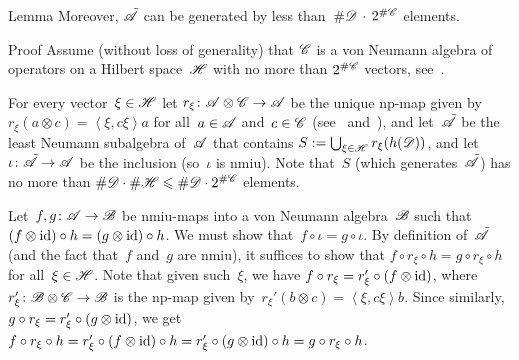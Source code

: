 \documentclass[a]{subfiles}
\begin{document}
\begin{parsec}
\begin{point}{Lemma}
Moreover,
$\tilde{\mathscr{A}}$
can be generated by
less than~$\#\mathscr{D}\,\cdot\,2^{\#\mathscr{C}}$ elements.
\begin{point}{Proof}%
Assume (without loss of generality)
that
$\mathscr{C}$
is a von Neumann algebra of operators on
a Hilbert space~$\mathscr{H}$
with no more than $2^{\#\mathscr{C}}$ vectors, see~.

For every vector~$\xi\in \mathscr{H}$
let
$r_\xi\colon \mathscr{A}\otimes \mathscr{C}\to\mathscr{A}$
be the unique np-map
given by~$r_\xi(a\otimes c) = \left<\xi,c\xi\right> a$
for all~$a\in\mathscr{A}$ and~$c\in \mathscr{C}$
(see~
and~),
and
let~$\tilde{\mathscr{A}}$
be the least Neumann subalgebra
of~$\mathscr{A}$
that contains $S:=\smash{ \bigcup_{\xi \in\mathscr{H}} r_\xi(h(\mathscr{D}))}$,
and let~$\iota\colon \tilde{\mathscr{A}}\to\mathscr{A}$
be the inclusion
(so~$\iota$ is nmiu).
Note that~$S$ (which generates~$\tilde{\mathscr{A}}$)
has no more than $\#\mathscr{D}\cdot\#\mathscr{H}\leqslant \#\mathscr{D} \cdot 2^{\#\mathscr{C}}$
elements.

Let~$f,g\colon \mathscr{A}\to\mathscr{B}$
be nmiu-maps
into a von Neumann algebra~$\mathscr{B}$
such that $(f\otimes\operatorname{id})\circ h = (g\otimes \operatorname{id})\circ h$.
We must show that~$f\circ \iota = g\circ \iota$.
By definition of~$\tilde{\mathscr{A}}$
(and the fact that~$f$ and~$g$ are nmiu),
it suffices to show that $f\circ r_\xi\circ h=g\circ r_\xi\circ h$
for all~$\xi\in\mathscr{H}$.
Note that given such~$\xi$,
we have $f\circ r_\xi = r_\xi' \circ (f\otimes\operatorname{id})$,
where~$r_\xi'\colon \mathscr{B}\otimes\mathscr{C}\to\mathscr{B}$
is the np-map
given by~$r_\xi'(b\otimes c)=\left<\xi,c\xi\right>b$.
Since similarly,
$g\circ r_\xi = r_\xi'\circ (g\otimes \operatorname{id})$,
we get~$f\circ r_\xi \circ h
= r_\xi' \circ (f\otimes \operatorname{id})\circ h
= r_\xi' \circ (g\otimes \operatorname{id})\circ h
= g\circ r_\xi \circ h$.


\end{point}
\end{point}
\end{parsec}
\end{document}
